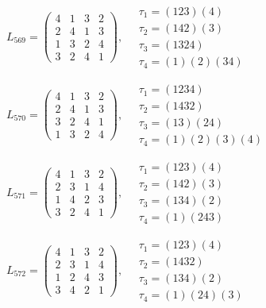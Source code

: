 $L_{569} = \begin{pmatrix} 4 & 1 & 3 & 2 \\ 2 & 4 & 1 & 3 \\ 1 & 3 & 2 & 4 \\ 3 & 2 & 4 & 1 \end{pmatrix}, \quad \begin{matrix} \tau_{1} = (1 2 3)(4) \\ \tau_{2} = (1 4 2)(3) \\ \tau_{3} = (1 3 2 4) \\ \tau_{4} = (1)(2)(3 4) \end{matrix}$

$L_{570} = \begin{pmatrix} 4 & 1 & 3 & 2 \\ 2 & 4 & 1 & 3 \\ 3 & 2 & 4 & 1 \\ 1 & 3 & 2 & 4 \end{pmatrix}, \quad \begin{matrix} \tau_{1} = (1 2 3 4) \\ \tau_{2} = (1 4 3 2) \\ \tau_{3} = (1 3)(2 4) \\ \tau_{4} = (1)(2)(3)(4) \end{matrix}$

$L_{571} = \begin{pmatrix} 4 & 1 & 3 & 2 \\ 2 & 3 & 1 & 4 \\ 1 & 4 & 2 & 3 \\ 3 & 2 & 4 & 1 \end{pmatrix}, \quad \begin{matrix} \tau_{1} = (1 2 3)(4) \\ \tau_{2} = (1 4 2)(3) \\ \tau_{3} = (1 3 4)(2) \\ \tau_{4} = (1)(2 4 3) \end{matrix}$

$L_{572} = \begin{pmatrix} 4 & 1 & 3 & 2 \\ 2 & 3 & 1 & 4 \\ 1 & 2 & 4 & 3 \\ 3 & 4 & 2 & 1 \end{pmatrix}, \quad \begin{matrix} \tau_{1} = (1 2 3)(4) \\ \tau_{2} = (1 4 3 2) \\ \tau_{3} = (1 3 4)(2) \\ \tau_{4} = (1)(2 4)(3) \end{matrix}$

